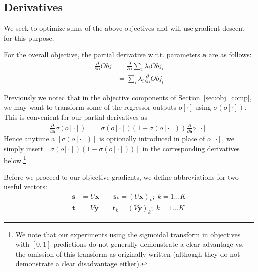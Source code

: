 \documentclass[11pt,a4paper]{article}
\renewcommand{\a}{\vec{a}}
\newcommand{\x}{\vec{x}}
\newcommand{\y}{\vec{y}}
\newcommand{\s}{\vec{s}}
\renewcommand{\t}{\vec{t}}
\renewcommand{\vec}[1]{\mathbf{#1}}
\begin{document}
\subsection{Derivatives}

\label{sec:obj_grad}

We seek to optimize sums of the above objectives and will use
gradient descent for this purpose.  

For the overall objective, the partial derivative 
w.r.t. parameters $\a$ are as follows:
\begin{align*}
\frac{\partial}{\partial \a} \mathit{Obj} & = \frac{\partial}{\partial \a} \sum_i \lambda_i \mathit{Obj}_i\\
& = \sum_i \lambda_i \frac{\partial}{\partial \a} \mathit{Obj}_i \label{eq:sum_der}
\end{align*}

Previously we noted that in the
objective components of Section~\ref{sec:obj_comp}, we may want to transform
some of the regressor outputs $o[\cdot]$ using $\sigma(o[\cdot])$.  
This is convenient for our partial derivatives as
\begin{align}
 \frac{\partial}{\partial \a}\sigma(o[\cdot]) & = \sigma(o[\cdot]) (1 - \sigma(o[\cdot])) \frac{\partial}{\partial \a} o[\cdot] .
\end{align}
Hence anytime a $[\sigma(o[\cdot])]$ is optionally 
introduced in place of $o[\cdot]$, we simply
insert $[\sigma(o[\cdot]) (1 - \sigma(o[\cdot]))]$ in the corresponding derivatives 
below.\footnote{We note that our experiments using the sigmoidal transform in
objectives with $[0,1]$ predictions do not generally demonstrate a
clear advantage vs. the omission of this transform as originally
written (although they do not demonstrate a clear disadvantage
either).}

Before we proceed to our objective gradients, we define abbreviations
for two useful vectors:
\begin{align*}
\s & = U \x \qquad \s_{k} = (U \x)_{k}; \; k=1\ldots K\\
\t & = V \y \qquad \t_{k} = (V \y)_{k}; \; k=1\ldots K
\end{align*}
\end{document}
